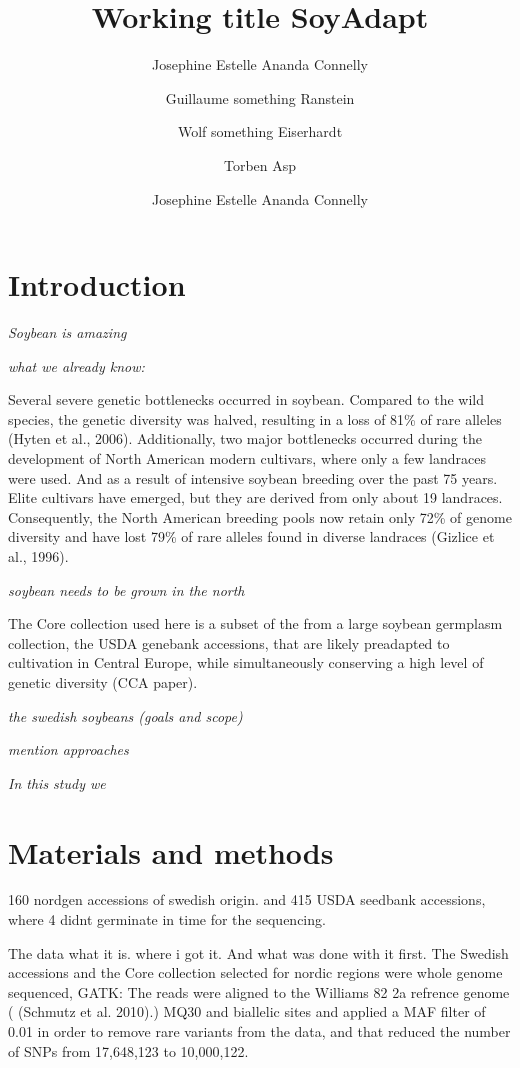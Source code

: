 \documentclass[9pt,twocolumn,twoside,lineno]{gsajnl}
\title{Working title SoyAdapt}
\author[1,$\dagger$,$\ast$]{Josephine Estelle Ananda Connelly}
\author[2]{Guillaume something Ranstein}
\author[3]{Wolf something Eiserhardt}
\author[4]{Torben Asp}
\author[5]{Josephine Estelle Ananda Connelly}
\affil[1]{AU}
\affil[2]{AU}
\affil[3]{AU, Kew}
\affil[4]{AU}
\affil[$\dagger$]{}
\begin{document}
\maketitle
\thispagestyle{firststyle}
\vspace{-13pt}%


\section{Introduction}

\textit{Soybean is amazing}

\textit{what we already know:}

Several severe genetic bottlenecks occurred in soybean. Compared to the wild species, the genetic diversity was halved, resulting in a loss of 81\% of rare alleles (Hyten et al., 2006). Additionally, two major bottlenecks occurred during the development of North American modern cultivars, where only a few landraces were used. And as a result of intensive soybean breeding over the past 75 years. Elite cultivars have emerged, but they are derived from only about 19 landraces. Consequently, the North American breeding pools now retain only 72\% of genome diversity and have lost 79\% of rare alleles found in diverse landraces (Gizlice et al., 1996).


\textit{soybean needs to be grown in the north}

The Core collection used here is a subset of the from a large soybean germplasm collection, the  USDA genebank accessions, that are likely preadapted to cultivation in Central Europe, while simultaneously conserving a high level of genetic diversity (CCA paper). 

\textit{the swedish soybeans (goals and scope)}


\textit{mention approaches}

\textit{In this study we}

\section{Materials and methods}
\label{sec:materials:methods}

160 nordgen accessions of swedish origin. and 415 USDA seedbank accessions, where 4 didnt germinate in time for the sequencing.  

The data what it is. where i got it.   And what was done with it first. 
The  Swedish accessions and the Core collection selected for nordic regions were whole genome sequenced, 
GATK: 
The reads were aligned to the Williams 82 2a refrence genome ( (Schmutz et al. 2010).)
MQ30 and biallelic sites and applied a MAF filter of 0.01 in order to remove rare variants from the data, and that reduced the number of SNPs from 17,648,123 to 10,000,122.
\end{document}
